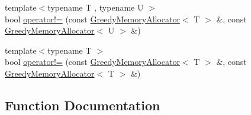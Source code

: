 \begin{DoxyCompactItemize}
\item 
{\footnotesize template$<$typename T , typename U $>$ }\\bool \hyperlink{namespaceuva_1_1utils_1_1containers_1_1alloc_aeaac32f0bd6302494219bc16381a664a}{operator!=} (const \hyperlink{classuva_1_1utils_1_1containers_1_1alloc_1_1_greedy_memory_allocator}{Greedy\+Memory\+Allocator}$<$ T $>$ \&, const \hyperlink{classuva_1_1utils_1_1containers_1_1alloc_1_1_greedy_memory_allocator}{Greedy\+Memory\+Allocator}$<$ U $>$ \&)
\item 
{\footnotesize template$<$typename T $>$ }\\bool \hyperlink{namespaceuva_1_1utils_1_1containers_1_1alloc_af9e7d5df5c1ba911ed417c0007bf486a}{operator!=} (const \hyperlink{classuva_1_1utils_1_1containers_1_1alloc_1_1_greedy_memory_allocator}{Greedy\+Memory\+Allocator}$<$ T $>$ \&, const \hyperlink{classuva_1_1utils_1_1containers_1_1alloc_1_1_greedy_memory_allocator}{Greedy\+Memory\+Allocator}$<$ T $>$ \&)
\end{DoxyCompactItemize}


\subsection{Function Documentation}
\hypertarget{namespaceuva_1_1utils_1_1containers_1_1alloc_ae65da467dfcf6c2ee5cc8dd2be1ca469}{}
